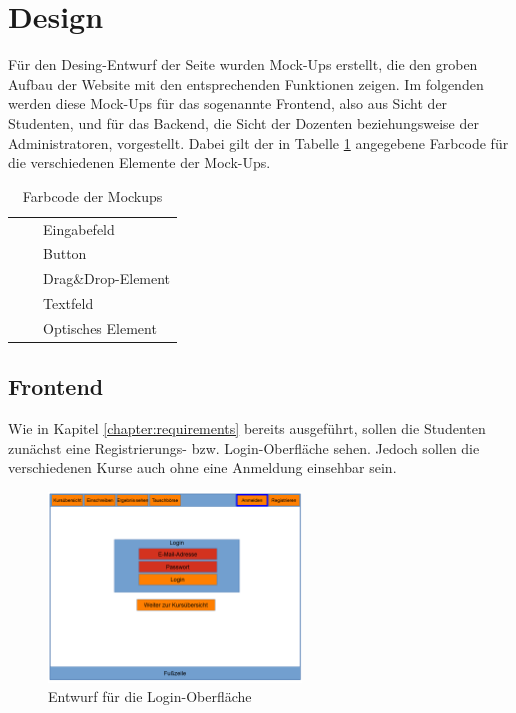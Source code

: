     \section{Design}
        Für den Desing-Entwurf der Seite wurden Mock-Ups erstellt, die den groben Aufbau der Website mit den entsprechenden Funktionen zeigen. 
        Im folgenden werden diese Mock-Ups für das sogenannte Frontend, also aus Sicht der Studenten, und für das Backend, die Sicht der Dozenten beziehungsweise der Administratoren, vorgestellt.
        Dabei gilt der in Tabelle \ref{tab:Farbcode} angegebene Farbcode für die verschiedenen Elemente der Mock-Ups.
        \begin{table}
            \centering
            \begin{tabular}{l c| l}
                \cellcolor{red} & & Eingabefeld\\
                \cellcolor{orange} & & Button\\
                \cellcolor{olive} & & Drag\&Drop-Element\\
                \cellcolor{green} & & Textfeld\\
                \cellcolor{blue} & & Optisches Element
            \end{tabular}
            \caption{Farbcode der Mockups}
            \label{tab:Farbcode}
        \end{table}
    
        \subsection{Frontend}
            Wie in Kapitel \ref{chapter:requirements} bereits ausgeführt, sollen die Studenten zunächst eine Registrierungs- bzw. Login-Oberfläche sehen.
            Jedoch sollen die verschiedenen Kurse auch ohne eine Anmeldung einsehbar sein.
            \begin{figure}[t]
            	\centering
            	\includegraphics[width=0.6\textwidth]{./design/images/MockUpsFrontend/frontendLogin.png}
            	\caption{Entwurf für die Login-Oberfläche}
            	\label{fig:mockupLoginFrontend}
            \end{figure}   
        
